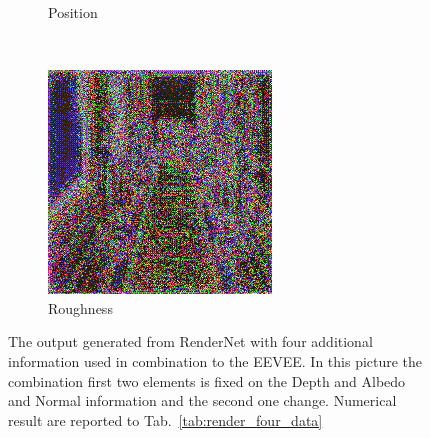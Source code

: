 \begin{figure}[h!]
\begin{subfigure}[b]{0.175\textwidth}
     \caption{Position}
    \end{subfigure}
    ~
    \begin{subfigure}[b]{0.175\textwidth}
     \includegraphics[width=\textwidth]{figures/result/quadruple/depth_albedo_normal_roughness/2.png}
     \caption{Roughness}\label{subfig:1}
    \end{subfigure}
    
    \caption{The output generated from RenderNet with four additional information used in combination to the EEVEE. In this picture the combination first two elements is fixed on the Depth and Albedo and Normal information and the second one change. Numerical result are reported to Tab.~\ref{tab:render_four_data}}
    \label{fig:quadruple_input_base_depth_albedo}
\end{figure}

